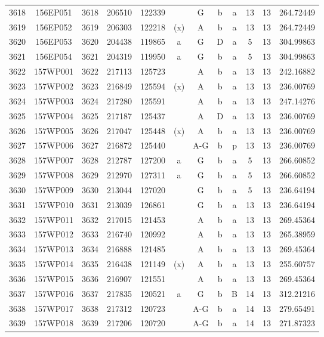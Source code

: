 \begin{tabular}{|*{12}{c|}}
3618 & 156EP051 & 3618 & 206510 & 122339 &  & G & b & a & 13 & 13 & 264.72449 \\ 
3619 & 156EP052 & 3619 & 206303 & 122218 & (x) & A & b & a & 13 & 13 & 264.72449 \\ 
3620 & 156EP053 & 3620 & 204438 & 119865 & a & G & D & a & 5 & 13 & 304.99863 \\ 
3621 & 156EP054 & 3621 & 204319 & 119950 & a & G & b & a & 5 & 13 & 304.99863 \\ 
3622 & 157WP001 & 3622 & 217113 & 125723 &  & A & b & a & 13 & 13 & 242.16882 \\ 
3623 & 157WP002 & 3623 & 216849 & 125594 & (x) & A & b & a & 13 & 13 & 236.00769 \\ 
3624 & 157WP003 & 3624 & 217280 & 125591 &  & A & b & a & 13 & 13 & 247.14276 \\ 
3625 & 157WP004 & 3625 & 217187 & 125437 &  & A & D & a & 13 & 13 & 236.00769 \\ 
3626 & 157WP005 & 3626 & 217047 & 125448 & (x) & A & b & a & 13 & 13 & 236.00769 \\ 
3627 & 157WP006 & 3627 & 216872 & 125440 &  & A-G & b & p & 13 & 13 & 236.00769 \\ 
3628 & 157WP007 & 3628 & 212787 & 127200 & a & G & b & a & 5 & 13 & 266.60852 \\ 
3629 & 157WP008 & 3629 & 212970 & 127311 & a & G & b & a & 5 & 13 & 266.60852 \\ 
3630 & 157WP009 & 3630 & 213044 & 127020 &  & G & b & a & 5 & 13 & 236.64194 \\ 
3631 & 157WP010 & 3631 & 213039 & 126861 &  & G & b & a & 13 & 13 & 236.64194 \\ 
3632 & 157WP011 & 3632 & 217015 & 121453 &  & A & b & a & 13 & 13 & 269.45364 \\ 
3633 & 157WP012 & 3633 & 216740 & 120992 &  & A & b & a & 13 & 13 & 265.38959 \\ 
3634 & 157WP013 & 3634 & 216888 & 121485 &  & A & b & a & 13 & 13 & 269.45364 \\ 
3635 & 157WP014 & 3635 & 216438 & 121149 & (x) & A & b & a & 13 & 13 & 255.60757 \\ 
3636 & 157WP015 & 3636 & 216907 & 121551 &  & A & b & a & 13 & 13 & 269.45364 \\ 
3637 & 157WP016 & 3637 & 217835 & 120521 & a & G & b & B & 14 & 13 & 312.21216 \\ 
3638 & 157WP017 & 3638 & 217312 & 120723 &  & A-G & b & a & 14 & 13 & 279.65491 \\ 
3639 & 157WP018 & 3639 & 217206 & 120720 &  & A-G & b & a & 14 & 13 & 271.87323 \\ 

\end{tabular}
